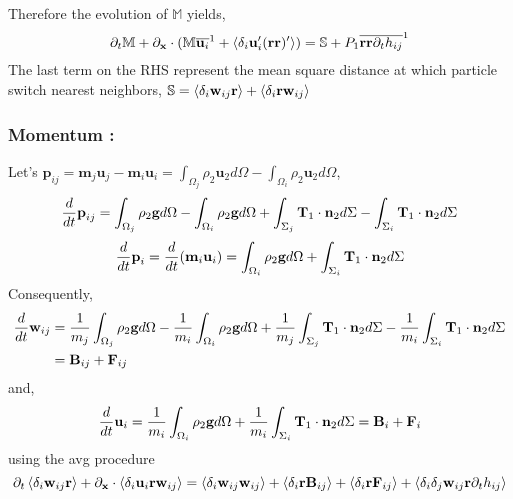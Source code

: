 Therefore the evolution of $\mathbb{M}$ yields, 
\begin{equation*}
    \partial_t \mathbb{M} 
  + \partial_\textbf{x} \cdot (\mathbb{M} \overline{\textbf{u}_i}^{1}
  + \left<\delta_i\textbf{u}_i' (\textbf{r} \textbf{r})'\right>)
  = 
   \mathbb{S}
  + P_1\overline{\textbf{r}\textbf{r}\partial_t h_{ij}}^{1}
\end{equation*}
The last term on the RHS represent the mean square distance at which particle switch nearest neighbors, $\mathbb{S} = \left<\delta_i\textbf{w}_{ij} \textbf{r}\right>
+ \left<\delta_i\textbf{r} \textbf{w}_{ij}\right> $



\subsubsection*{Momentum :}
Let's $\textbf{p}_{ij} = \textbf{m}_j \textbf{u}_j-\textbf{m}_i \textbf{u}_i =\int_{\Omega_j}\rho_2 \textbf{u}_2d\Omega
- \int_{\Omega_i}\rho_2 \textbf{u}_2d\Omega$, 
\begin{equation}
\frac{d}{d t} \textbf{p}_{ij} 
= \int_{\Omega_j}\rho_2\textbf{g}d\Omega 
- \int_{\Omega_i}\rho_2\textbf{g}d\Omega
+ \int_{\Sigma_j} \textbf{T}_1 \cdot \textbf{n}_2d\Sigma
-\int_{\Sigma_i} \textbf{T}_1 \cdot \textbf{n}_2d\Sigma
\end{equation}
\begin{equation}
\frac{d}{d t} \textbf{p}_{i} 
= \frac{d}{d t} (\textbf{m}_i \textbf{u}_i)
= \int_{\Omega_i}\rho_2\textbf{g}d\Omega
+ \int_{\Sigma_i} \textbf{T}_1 \cdot \textbf{n}_2d\Sigma
\end{equation}
Consequently, 
\begin{align*}
    \frac{d}{d t} \textbf{w}_{ij} 
    &= \frac{1}{m_j}\int_{\Omega_j}\rho_2\textbf{g}d\Omega 
    - \frac{1}{m_i}\int_{\Omega_i}\rho_2\textbf{g}d\Omega
    + \frac{1}{m_j}\int_{\Sigma_j} \textbf{T}_1 \cdot \textbf{n}_2d\Sigma
    - \frac{1}{m_i}\int_{\Sigma_i} \textbf{T}_1 \cdot \textbf{n}_2d\Sigma\\
    &=\textbf{B}_{ij} + \textbf{F}_{ij}
\end{align*}
and, 
\begin{equation}
    \frac{d}{d t} \textbf{u}_{i} 
    = \frac{1}{m_i}\int_{\Omega_i}\rho_2\textbf{g}d\Omega
    + \frac{1}{m_i}\int_{\Sigma_i} \textbf{T}_1 \cdot \textbf{n}_2d\Sigma
    = \textbf{B}_i + \textbf{F}_i
\end{equation}
using the avg procedure 
\begin{equation*}
    \partial_t \left<\delta_i\textbf{w}_{ij}\textbf{r}\right> 
  + \partial_\textbf{x} \cdot \left<\delta_i\textbf{u}_i \textbf{r}\textbf{w}_{ij}\right>
  = \left<\delta_i\textbf{w}_{ij}\textbf{w}_{ij}\right>
  + \left<\delta_i\textbf{r} \textbf{B}_{ij}\right> 
  + \left<\delta_i\textbf{r} \textbf{F}_{ij}\right> 
  + \left<\delta_i\delta_{j}\textbf{w}_{ij}\textbf{r}\partial_t h_{ij} \right>
\end{equation*}
